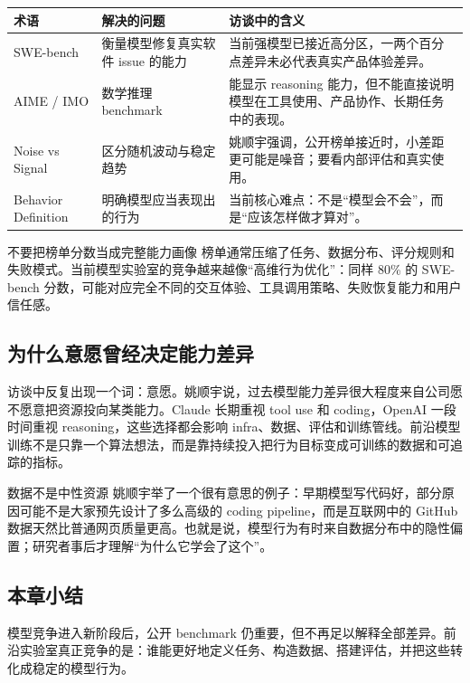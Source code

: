 \documentclass[a4paper]{article}
\begin{document}
\noindent\begin{tabularx}{\textwidth}{p{}p{}X}
\toprule
术语 & 解决的问题 & 访谈中的含义 \\
\midrule
SWE-bench & 衡量模型修复真实软件 issue 的能力 & 当前强模型已接近高分区，一两个百分点差异未必代表真实产品体验差异。 \\
AIME / IMO & 数学推理 benchmark & 能显示 reasoning 能力，但不能直接说明模型在工具使用、产品协作、长期任务中的表现。 \\
Noise vs Signal & 区分随机波动与稳定趋势 & 姚顺宇强调，公开榜单接近时，小差距更可能是噪音；要看内部评估和真实使用。 \\
Behavior Definition & 明确模型应当表现出的行为 & 当前核心难点：不是“模型会不会”，而是“应该怎样做才算对”。 \\
\bottomrule
\end{tabularx}

\begin{warningbox}{不要把榜单分数当成完整能力画像}
榜单通常压缩了任务、数据分布、评分规则和失败模式。当前模型实验室的竞争越来越像“高维行为优化”：同样 80\% 的 SWE-bench 分数，可能对应完全不同的交互体验、工具调用策略、失败恢复能力和用户信任感。
\end{warningbox}

\subsection{为什么意愿曾经决定能力差异}

访谈中反复出现一个词：意愿。姚顺宇说，过去模型能力差异很大程度来自公司愿不愿意把资源投向某类能力。Claude 长期重视 tool use 和 coding，OpenAI 一段时间重视 reasoning，这些选择都会影响 infra、数据、评估和训练管线。前沿模型训练不是只靠一个算法想法，而是靠持续投入把行为目标变成可训练的数据和可追踪的指标。

\begin{knowledgebox}{数据不是中性资源}
姚顺宇举了一个很有意思的例子：早期模型写代码好，部分原因可能不是大家预先设计了多么高级的 coding pipeline，而是互联网中的 GitHub 数据天然比普通网页质量更高。也就是说，模型行为有时来自数据分布中的隐性偏置；研究者事后才理解“为什么它学会了这个”。
\end{knowledgebox}

\subsection{本章小结}

模型竞争进入新阶段后，公开 benchmark 仍重要，但不再足以解释全部差异。前沿实验室真正竞争的是：谁能更好地定义任务、构造数据、搭建评估，并把这些转化成稳定的模型行为。
\end{document}
